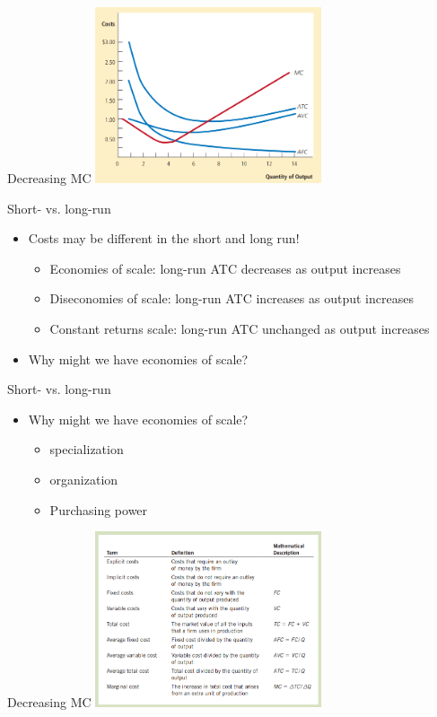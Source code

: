 \documentclass[aspectratio=169]{beamer}
\begin{document}
\begin{frame}{Decreasing MC}
    \centering
    \includegraphics[width = 0.5\textwidth,keepaspectratio]{../figs/decreasingMC.png}
\end{frame}

\begin{frame}{Short- vs. long-run}
    \begin{itemize}
        \item Costs may be different in the short and long run!
            \begin{itemize}
                \item Economies of scale: long-run ATC decreases as output increases
                \item Diseconomies of scale: long-run ATC increases as output increases
                \item Constant returns scale: long-run ATC unchanged as output increases 
            \end{itemize}
        \item Why might we have economies of scale?
    \end{itemize}
\end{frame}

\begin{frame}{Short- vs. long-run}
    \begin{itemize}
        \item Why might we have economies of scale?
            \begin{itemize}
                \item specialization
                \item organization
                \item Purchasing power
            \end{itemize}
    \end{itemize}
\end{frame}

\begin{frame}{Decreasing MC}
    \centering
    \includegraphics[width = 0.5\textwidth,keepaspectratio]{../figs/summary.png}
\end{frame}
\end{document}
